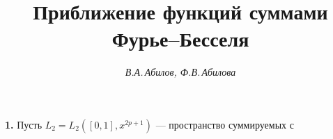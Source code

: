 

 


% 


\newcommand{\tts}[1]{} 


 




\setcounter{page}{3} 












 


\author{\it В.А.\,Абилов, Ф.В.\,Абилова} 




\title{Приближение функций суммами Фурье--Бесселя} 


 


\date{} 




\pagestyle{plain} %


 




\maketitle 


\label{begin} 


 


 


{\bf 1.} Пусть $L_2=L_2([0,1],x^{2p+1})$ --- пространство суммируемых с 


